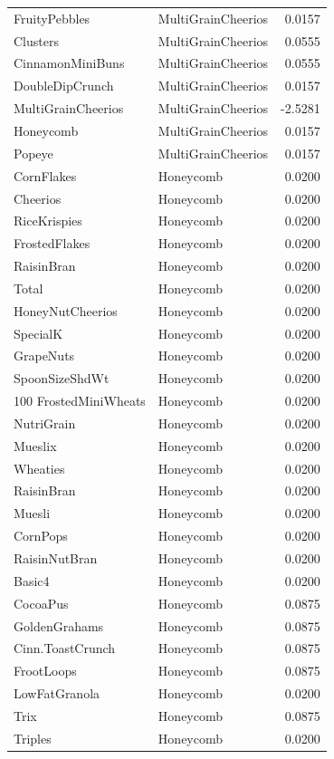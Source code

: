 \begin{longtable}{llr}
FruityPebbles & MultiGrainCheerios & 0.0157 \\
Clusters & MultiGrainCheerios & 0.0555 \\
CinnamonMiniBuns & MultiGrainCheerios & 0.0555 \\
DoubleDipCrunch & MultiGrainCheerios & 0.0157 \\
MultiGrainCheerios & MultiGrainCheerios & -2.5281 \\
Honeycomb & MultiGrainCheerios & 0.0157 \\
Popeye & MultiGrainCheerios & 0.0157 \\
CornFlakes & Honeycomb & 0.0200 \\
Cheerios & Honeycomb & 0.0200 \\
RiceKrispies & Honeycomb & 0.0200 \\
FrostedFlakes & Honeycomb & 0.0200 \\
RaisinBran & Honeycomb & 0.0200 \\
Total & Honeycomb & 0.0200 \\
HoneyNutCheerios & Honeycomb & 0.0200 \\
SpecialK & Honeycomb & 0.0200 \\
GrapeNuts & Honeycomb & 0.0200 \\
SpoonSizeShdWt & Honeycomb & 0.0200 \\
100%
FrostedMiniWheats & Honeycomb & 0.0200 \\
NutriGrain & Honeycomb & 0.0200 \\
Mueslix & Honeycomb & 0.0200 \\
Wheaties & Honeycomb & 0.0200 \\
RaisinBran & Honeycomb & 0.0200 \\
Muesli & Honeycomb & 0.0200 \\
CornPops & Honeycomb & 0.0200 \\
RaisinNutBran & Honeycomb & 0.0200 \\
Basic4 & Honeycomb & 0.0200 \\
CocoaPus & Honeycomb & 0.0875 \\
GoldenGrahams & Honeycomb & 0.0875 \\
Cinn.ToastCrunch & Honeycomb & 0.0875 \\
FrootLoops & Honeycomb & 0.0875 \\
LowFatGranola & Honeycomb & 0.0200 \\
Trix & Honeycomb & 0.0875 \\
Triples & Honeycomb & 0.0200 \\

\end{longtable}
